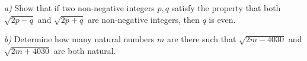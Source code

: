 \textit{a)} Show that if two non-negative integers $ p,q $ satisfy the property that both $ \sqrt{2p-q} $ and $ \sqrt{2p+q} $ are non-negative integers, then $ q $ is even.

\textit{b)} Determine how many natural numbers $ m $ are there such that $ \sqrt{2m-4030} $ and $ \sqrt{2m+4030} $ are both natural.